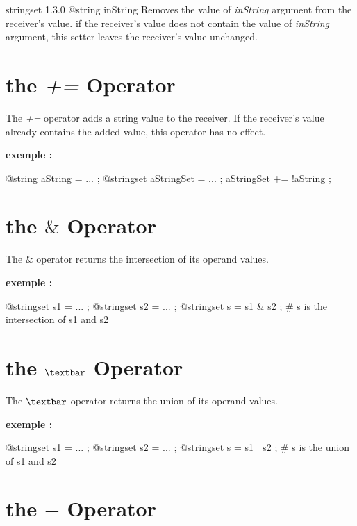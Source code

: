 {stringset}
{1.3.0}
{@string inString}
{Removes the value of \emph{inString} argument from the receiver's value.}
{if the receiver's value does not contain the value of \emph{inString} argument, this setter leaves the receiver's value unchanged.}






\section{the \emph{+=} Operator}

The \emph{+=} operator adds a string value to the receiver. If the receiver's value already contains the added value, this operator has no effect.

\textbf{exemple :}
\begin{galgascode}
@string aString = ... ;
@stringset aStringSet = ... ;
aStringSet += !aString ;
\end{galgascode}




\section{the \emph{$\&$} Operator}

The \emph{$\&$} operator returns the intersection of its operand values.

\textbf{exemple :}
\begin{galgascode}
@stringset s1 = ... ;
@stringset s2 = ... ;
@stringset s = s1 & s2 ; # s is the intersection of s1 and s2
\end{galgascode}






\section{the \emph{$\textbar$} Operator}

The \emph{$\textbar$} operator returns the union of its operand values.

\textbf{exemple :}
\begin{galgascode}
@stringset s1 = ... ;
@stringset s2 = ... ;
@stringset s = s1 | s2 ; # s is the union of s1 and s2
\end{galgascode}






\section{the \emph{$-$} Operator}

